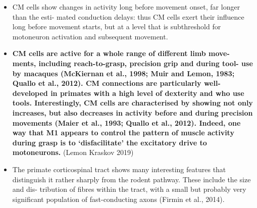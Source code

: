 {\begin{itemize}
              motoneurons (Porter and Lemon, 1993; Rathelot and Strick,
              2006; Zinger et al., 2013), allowing the motor cortex
              direct access to spinal motoneurons. Of course, the CM
              system does not act alone, but in parallel with many other
              local interneuronal mechanisms and other descending
              pathways (Baker, 2011; Lemon, 2008), seg- mental (Takei
              and Seki, 2010) and propriospinal systems (Kinoshita et
              al., 2012). It is interesting that CM synapses on
              motoneurons are not subject to presynaptic inhibition
              (Jackson et al., 2006), suggesting that other systems
              (e.g.~peripheral affer- ent inputs from the moving limb)
              do not use this mechanism to modify CM inputs to
              motoneurons, which would mean that information delivered
              by CM projections is allowed unfettered influence over
              target motoneurons.
            \item
              CM cells show changes in activity long before movement
              onset, far longer than the esti- mated conduction delays:
              thus CM cells exert their influence long before movement
              starts, but at a level that is subthreshold for motoneuron
              activation and subsequent movement.
            \item
              \textbf{CM cells are active for a whole range of different
              limb move- ments, including reach-to-grasp, precision grip
              and during tool- use by macaques (McKiernan et al., 1998;
              Muir and Lemon, 1983; Quallo et al., 2012). CM connections
              are particularly well- developed in primates with a high
              level of dexterity and who use tools. Interestingly, CM
              cells are characterised by showing not only increases, but
              also decreases in activity before and during precision
              movements (Maier et al., 1993; Quallo et al., 2012).
              Indeed, one way that M1 appears to control the pattern of
              muscle activity during grasp is to `disfacilitate' the
              excitatory drive to motoneurons.} (Lemon Kraskov 2019)
            \item
              The primate corticospinal tract shows many interesting
              features that distinguish it rather sharply from the
              rodent pathway. These include the size and dis- tribution
              of fibres within the tract, with a small but probably very
              significant population of fast-conducting axons (Firmin et
              al., 2014).
            \end{itemize}

}
